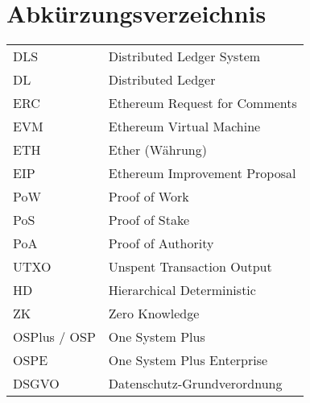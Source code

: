 
\section{Abkürzungsverzeichnis}

\begin{longtable}{p{6 cm}p{9 cm}}
    DLS & Distributed Ledger System \\
    DL & Distributed Ledger \\
    ERC & Ethereum Request for Comments \\
    EVM & Ethereum Virtual Machine \\
    ETH & Ether (Währung) \\
    EIP & Ethereum Improvement Proposal \\
    PoW & Proof of Work \\
    PoS & Proof of Stake \\
    PoA & Proof of Authority \\
    UTXO & Unspent Transaction Output \\
    HD & Hierarchical Deterministic \\
    ZK & Zero Knowledge \\
    OSPlus / OSP & One System Plus \\
    OSPE & One System Plus Enterprise \\
    DSGVO & Datenschutz-Grundverordnung \\
\end{longtable}

   